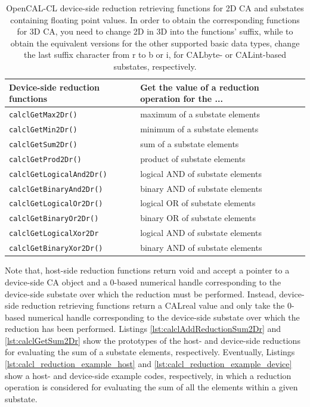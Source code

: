 \begin{table}
  \centering
  \footnotesize
  \begin{tabular}{l|l}
    \hline
    Device-side reduction functions & Get the value of a reduction operation for the ... \\
    \hline
    \verb'calclGetMax2Dr()'        & maximum of a substate elements\\
    \verb'calclGetMin2Dr()'        & minimum of a substate elements\\
    \verb'calclGetSum2Dr()'        & sum of a substate elements\\
    \verb'calclGetProd2Dr()'       & product of substate elements\\
    \verb'calclGetLogicalAnd2Dr()' & logical AND of substate elements\\
    \verb'calclGetBinaryAnd2Dr()'  & binary AND of substate elements\\
    \verb'calclGetLogicalOr2Dr()'  & logical OR of substate elements\\
    \verb'calclGetBinaryOr2Dr()'   & binary OR of substate elements\\
    \verb'calclGetLogicalXor2Dr'   & logical AND of substate elements\\
    \verb'calclGetBinaryXor2Dr()'  & binary AND of substate elements\\
    \hline
  \end{tabular}
  \caption{OpenCAL-CL device-side reduction retrieving functions for 2D CA and
    substates containing floating point values. In order to obtain the
    corresponding functions for 3D CA, you need to change 2D in 3D
    into the functions' suffix, while to obtain the equivalent
    versions for the other supported basic data types, change the last
    suffix character from r to b or i, for CALbyte- or CALint-based
    substates, respectively.}
  \label{tab:calcl-device-reductions}
\end{table}


Note that, host-side reduction functions return void and accept a
pointer to a device-side CA object and a 0-based numerical handle
corresponding to the device-side substate over which the reduction
must be performed. Instead, device-side reduction retrieving functions
return a CALreal value and only take the 0-based numerical handle
corresponding to the device-side substate over which the reduction has
been performed. Listings \ref{lst:calclAddReductionSum2Dr} and
\ref{lst:calclGetSum2Dr} show the prototypes of the host- and
device-side reductions for evaluating the sum of a substate elements,
respectively. Eventually, Listings
\ref{lst:calcl_reduction_example_host} and
\ref{lst:calcl_reduction_example_device} show a host- and device-side
example codes, respectively, in which a reduction operation is
considered for evaluating the sum of all the elements within a given
substate.

